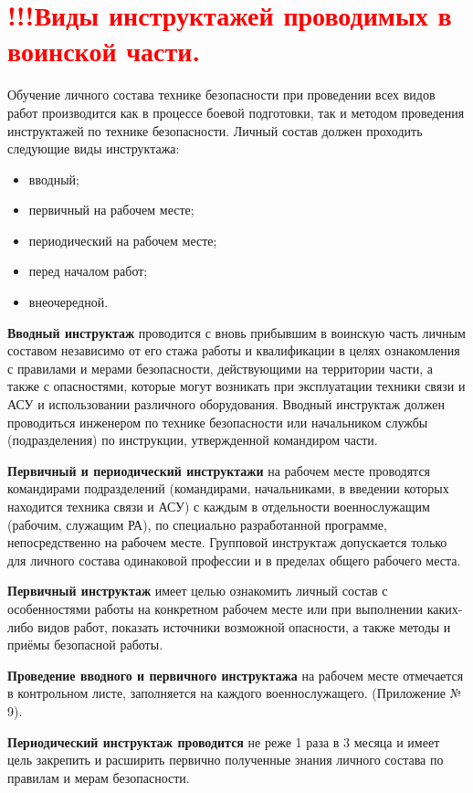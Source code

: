 \documentclass[12pt,a4paper]{report}
\begin{document}
\section{\textcolor{red}{!!!Виды инструктажей проводимых в воинской части.}}
Обучение личного состава технике безопасности при проведении всех видов работ производится как в процессе боевой подготовки, так и методом проведения инструктажей по технике безопасности. Личный состав должен проходить следующие виды инструктажа:
\begin{itemize}
\item вводный;
\item первичный на рабочем месте;
\item периодический на рабочем месте;
\item перед началом работ;
\item внеочередной.
\end{itemize}
\textbf{Вводный инструктаж }проводится с вновь прибывшим в воинскую часть личным составом независимо от его стажа работы и квалификации в целях ознакомления с правилами и мерами безопасности, действующими на территории части, а также с опасностями, которые могут возникать при эксплуатации техники связи и АСУ и использовании различного оборудования. Вводный инструктаж должен проводиться инженером по технике безопасности или начальником службы (подразделения) по инструкции, утвержденной командиром части.

\textbf{Первичный и периодический инструктажи }на рабочем месте проводятся командирами подразделений (командирами, начальниками, в введении которых находится техника связи и АСУ) с каждым в отдельности военнослужащим (рабочим, служащим РА), по специально разработанной программе, непосредственно на рабочем месте. Групповой инструктаж допускается только для личного состава одинаковой профессии и в пределах общего рабочего места.

\textbf{Первичный инструктаж} имеет целью ознакомить личный состав с особенностями работы на конкретном рабочем месте или при выполнении каких-либо видов работ, показать источники возможной опасности, а также методы и приёмы безопасной работы.

\textbf{Проведение вводного и первичного инструктажа} на рабочем месте отмечается в контрольном листе, заполняется на каждого военнослужащего. (Приложение № 9).

\textbf{Периодический инструктаж проводится} не реже 1 раза в 3 месяца и имеет цель закрепить и расширить первично полученные знания личного состава по правилам и мерам безопасности.
\end{document}

